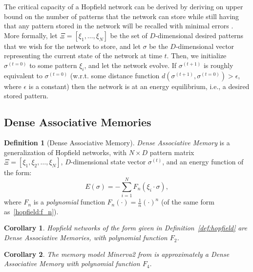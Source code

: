 \documentclass{article}
\newtheorem{corollary}{Corollary}
\theoremstyle{definition}
\newtheorem{definition}{Definition}[section]
\begin{document}
The critical capacity of a Hopfield network can be derived by deriving
on upper bound on the number of patterns that the network can store while
still having that any pattern stored in the network will be recalled with minimal
errors \parencites{krotov_dense_2016,demircigil_model_2017,krotov_modern_2025}.
More formally, let $\Xi = [\xi_1, \dots, \xi_N]$ be the set of $D$-dimensional desired
patterns that we wish for the network to store, and let $\sigma$ be the
$D$-dimensional vector representing the current state of the network at time $t$.
Then, we initialize $\sigma^{(t=0)}$ to some pattern $\xi_i$, and let the 
network evolve. If $\sigma^{(t+1)}$ is roughly equivalent to $\sigma^{(t=0)}$
(w.r.t. some distance function $d(\sigma^{(t+1)}, \sigma^{(t=0)}) > \epsilon$, where $\epsilon$
is a constant) then the network is at an energy equilibrium, i.e., a desired stored pattern.

\subsection{Dense Associative Memories}\label{sec:dam}

\begin{definition}[Dense Associative Memory]
    \textit{Dense Associative Memory} is a generalization of Hopfield networks,
    with $N \times D$ pattern matrix $\Xi = [\xi_1, \xi_2, \dots, \xi_N]$,
    $D$-dimensional state vector $\sigma^{(t)}$, and an energy function of the form:
    \begin{equation}
    E(\sigma) = - \sum^N_{i=1} F_n \left( \xi_i \cdot \sigma \right),
    \end{equation}
    where $F_n$ is a \textit{polynomial} function $F_n(\cdot) = \frac{1}{n}(\cdot)^{n}$ (of the same form 
    as~\autoref{hopfield:f_n}).
\end{definition}

\begin{corollary}
    Hopfield networks of the form given in Definition~\ref{def:hopfield}
    are Dense Associative Memories, with polynomial function $F_2$.
\end{corollary}

\begin{corollary}
    The memory model \textsf{Minerva2} from \textcite{hintzman_minerva_1984} is approximately
    a Dense Associative Memory with polynomial function $F_4$.
\end{corollary}
\end{document}

